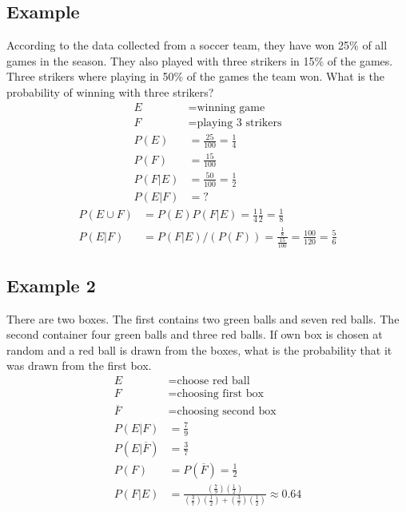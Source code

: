 \documentclass{article}
\theoremstyle{mytheoremstyle}
\theoremstyle{mytheoremstyle}
\theoremstyle{myproblemstyle}
\begin{document}
    \subsection*{Example}
    According to the data collected from a soccer team, they have won 25\% of
    all games in the season. They also played with three strikers in 15\% of the
    games. Three strikers where playing in 50\% of the games the team won. What
    is the probability of winning with three strikers?
    \begin{align*}
        E &= \text{winning game} \\
        F &= \text{playing 3 strikers} \\
        P(E) &= \frac{25}{100} = \frac{1}{4} \\
        P(F) &= \frac{15}{100} \\
        P(F | E) &= \frac{50}{100} = \frac{1}{2} \\
        P(E | F) &= ?
    \end{align*}
    \begin{align*}
        P(E \cup F) &= P(E)P(F | E) = \frac{1}{4} \frac{1}{2} = \frac{1}{8} \\
        P(E | F) &= P(F | E)/(P(F)) = \frac{\frac{1}{8}}{\frac{15}{100}} = \frac{100}{120} = \frac{5}{6}
    \end{align*}

    \subsection*{Example 2}
    There are two boxes. The first contains two green balls and seven red balls.
    The second container four green balls and three red balls. If own box is
    chosen at random and a red ball is drawn from the boxes, what is the
    probability that it was drawn from the first box.
    \begin{align*}
        E &= \text{choose red ball} \\
        F &= \text{choosing first box} \\
        \overline{F} &= \text{choosing second box} \\
        P(E | F) &= \frac{7}{9} \\
        P(E | \overline{F}) &= \frac{3}{7} \\
        P(F) &= P(\overline{F})= \frac{1}{2} \\
        P(F | E) &= \frac{(\frac{7}{9})(\frac{1}{2})}{(\frac{3}{7})(\frac{1}{2})+(\frac{3}{7})(\frac{1}{2})}
        \approx 0.64
    \end{align*}
\end{document}
